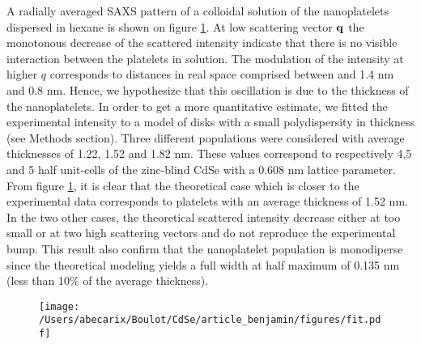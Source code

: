 \documentclass[journal = jacsat, manuscript=article, layout = twocolumn]{achemso}
\begin{document}
A radially averaged SAXS pattern of a colloidal solution of the nanoplatelets dispersed in hexane is shown on figure \ref{SAXS_plaq}. At low scattering vector $\bf{q}$ the monotonous decrease of the scattered intensity indicate that there is no visible interaction between the platelets in solution. The modulation of the intensity at higher $q$ corresponds to distances in real space comprised between and 1.4 nm and 0.8 nm. Hence, we hypothesize that this oscillation is due to the thickness of the nanoplatelets. In order to get a more quantitative estimate, we fitted the experimental intensity to a model of disks with a small polydispersity in thickness (see Methods section). Three different populations were considered with average thicknesses of 1.22, 1.52 and 1.82 nm. These values correspond to respectively 4,5 and 5 half unit-cells of the zinc-blind CdSe with a 0.608 nm lattice parameter. From figure \ref{SAXS_plaq}, it is clear that the theoretical case which is closer to the experimental data corresponds to platelets with an average thickness of 1.52 nm. In the two other cases, the theoretical scattered intensity decrease either at too small or at two high scattering vectors and do not reproduce the experimental bump. This result also confirm that the nanoplatelet population is monodiperse since the theoretical modeling yields a full width at half maximum of 0.135 nm (less than 10\% of the average thickness). 


\begin{figure}
\begin{center}
\texttt{[image: /Users/abecarix/Boulot/CdSe/article\_benjamin/figures/fit.pdf]}
\caption{\label{SAXS_plaq}}
\end{center}
\end{figure}
\end{document}
